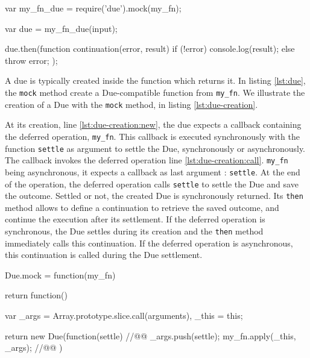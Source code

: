 \begin{code}[js, %
             caption={Example of a due}, %
             label={lst:due}] %
var my_fn_due = require('due').mock(my_fn);

var due = my_fn_due(input);

due.then(function continuation(error, result) {
  if (!error) {
    console.log(result);
  } else {
    throw error;
  }
});
\end{code}

A due is typically created inside the function which returns it.
In listing \ref{lst:due}, the \texttt{mock} method create a Due-compatible function from \texttt{my\_fn}.
We illustrate the creation of a Due with the \texttt{mock} method, in listing \ref{lst:due-creation}.

At its creation, line \ref{lst:due-creation:new}, the due expects a callback containing the deferred operation, \texttt{my\_fn}.
This callback is executed synchronously with the function \texttt{settle} as argument to settle the Due, synchronously or asynchronously.
The callback invokes the deferred operation line \ref{lst:due-creation:call}.
\texttt{my\_fn} being asynchronous, it expects a callback as last argument : \texttt{settle}.
At the end of the operation, the deferred operation calls \texttt{settle} to settle the Due and save the outcome.
Settled or not, the created Due is synchronously returned.
Its \texttt{then} method allows to define a continuation to retrieve the saved outcome, and continue the execution after its settlement.
If the deferred operation is synchronous, the Due settles during its creation and the \texttt{then} method immediately calls this continuation.
If the deferred operation is asynchronous, this continuation is called during the Due settlement.


\begin{code}[js, %
             caption={Creation of a due}, %
             label={lst:due-creation}] %
Due.mock = function(my_fn) {
  return function() {
    var _args = Array.prototype.slice.call(arguments),
        _this = this;

    return new Due(function(settle) {  //@\label{lst:due-creation:new}@
      _args.push(settle);
      my_fn.apply(_this, _args); //@\label{lst:due-creation:call}@
    })
  }
}
\end{code}

